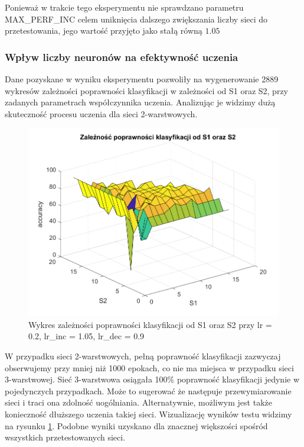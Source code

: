 \documentclass[12pt,twoside]{article}
\begin{document}
Ponieważ w trakcie tego eksperymentu nie sprawdzano parametru MAX\_PERF\_INC celem uniknięcia dalszego zwiększania liczby sieci do przetestowania, jego wartość przyjęto jako stałą równą $1.05$

\clearpage
\subsubsection{Wpływ liczby neuronów na efektywność uczenia}
Dane pozyskane w wyniku eksperymentu pozwoliły na wygenerowanie 2889 wykresów zależności poprawności klasyfikacji w zależności od S1 oraz S2, przy zadanych parametrach współczynnika uczenia.
Analizując je widzimy dużą skuteczność procesu uczenia dla sieci 2-warstwowych.


\begin{figure}[ht]
	\centering
	\includegraphics[width=16cm]{figures/S1S2_1.png}
	\caption{Wykres zależności poprawności klasyfikacji od S1 oraz S2 przy lr = 0.2, lr\_inc = 1.05, lr\_dec = 0.9}
	\label{Fig:S1S2_1}
\end{figure}

W przypadku sieci 2-warstwowych, pełną poprawność klasyfikacji zazwyczaj obserwujemy przy mniej niż 1000 epokach, co nie ma miejsca w przypadku sieci\\ 3-warstwowej.
Sieć 3-warstwowa osiągała 100\% poprawność klasyfikacji jedynie w pojedynczych przypadkach.
Może to sugerować że następuje przewymiarowanie sieci i traci ona zdolność uogólniania.
Alternatywnie, możliwym jest także konieczność dłuższego uczenia takiej sieci.
Wizualizację wyników testu widzimy na rysunku \ref{Fig:S1S2_1}.
Podobne wyniki uzyskano dla znacznej większości spośród wszystkich przetestowanych sieci.
\end{document}
